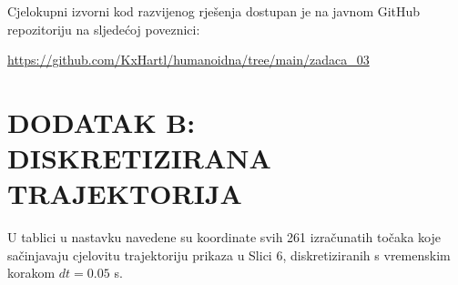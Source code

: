 \documentclass[12pt,a4paper]{article}
\begin{document}
Cjelokupni izvorni kod razvijenog rješenja dostupan je na javnom GitHub repozitoriju na sljedećoj poveznici:

\begin{center}
    \url{https://github.com/KxHartl/humanoidna/tree/main/zadaca_03}
\end{center}

\newpage
\section*{DODATAK B: DISKRETIZIRANA TRAJEKTORIJA}

U tablici u nastavku navedene su koordinate svih 261 izračunatih točaka koje sačinjavaju cjelovitu trajektoriju prikaza u Slici 6, diskretiziranih s vremenskim korakom $dt = 0.05$ s.


\end{document}
